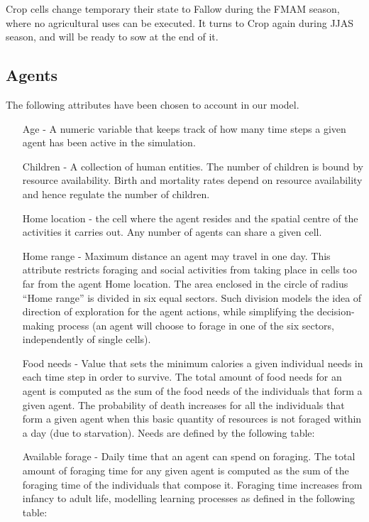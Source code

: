 \documentclass[11pt,oneside,a4paper,openright]{report}
\begin{document}
Crop cells change temporary their state to Fallow during the FMAM season, where no agricultural
uses can be executed. It turns to Crop again during JJAS season, and will be ready to sow at the end
of it.


\subsection{Agents}
The following attributes have been chosen to account in our model.

\begin{enumerate}
\item[Age] - A numeric variable that keeps track of how many time steps a given agent has been
active in the simulation.
\item[Children] - A collection of human entities. The number of children is bound by resource
availability. Birth and mortality rates depend on resource availability and hence regulate the 
number of children.
\item[Home location] - the cell where the agent resides and the spatial centre of the activities it
carries out. Any number of agents can share a given cell.
\item[Home range] - Maximum distance an agent may travel in one day. This attribute restricts
foraging and social activities from taking place in cells too far from the agent Home location.
The area enclosed in the circle of radius “Home range” is divided in six equal sectors. Such
division models the idea of direction of exploration for the agent actions, while simplifying the
decision-making process (an agent will choose to forage in one of the six sectors,
independently of single cells).
\item[Food needs] - Value that sets the minimum calories a given individual needs in each time step
in order to survive. The total amount of food needs for an agent is computed as the sum of the
food needs of the individuals that form a given agent. The probability of death increases for all
the individuals that form a given agent when this basic quantity of resources is not foraged
within a day (due to starvation). Needs are defined by the following table:
\item[Available forage] - Daily time that an agent can spend on foraging. The total amount of
foraging time for any given agent is computed as the sum of the foraging time of the
individuals that compose it. Foraging time increases from infancy to adult life, modelling
learning processes as defined in the following table:


\end{enumerate}
\end{document}
